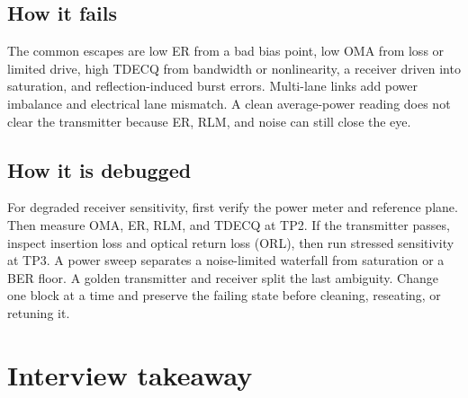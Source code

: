 \subsection{How it fails}
\label{sec:imdd-how-fails}

The common escapes are low ER from a bad bias point, low OMA from loss or limited
drive, high TDECQ from bandwidth or nonlinearity, a receiver driven into
saturation, and reflection-induced burst errors. Multi-lane links add power
imbalance and electrical lane mismatch. A clean average-power reading does not
clear the transmitter because ER, RLM, and noise can still close the eye.


\subsection{How it is debugged}
\label{sec:imdd-how-debugged}

For degraded receiver sensitivity, first verify the power meter and reference
plane. Then measure OMA, ER, RLM, and TDECQ at TP2. If the transmitter passes,
inspect insertion loss and optical return loss (ORL), then run stressed sensitivity
at TP3. A power sweep separates a noise-limited waterfall from saturation or a BER
floor. A golden transmitter and receiver split the last ambiguity. Change one
block at a time and preserve the failing state before cleaning, reseating, or
retuning it.


\section{Interview takeaway}
\label{sec:imdd-design-review}

